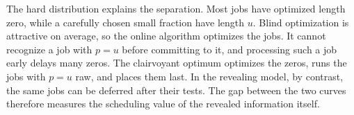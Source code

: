 The hard distribution explains the separation.  Most jobs have optimized
length zero, while a carefully chosen small fraction have length $u$.  Blind
optimization is attractive on average, so the online algorithm optimizes the
jobs.  It cannot recognize a job with $p=u$ before committing to it, and
processing such a job early delays many zeros.  The clairvoyant optimum
optimizes the zeros, runs the jobs with $p=u$ raw, and places them last.  In
the revealing model, by contrast, the same jobs can be deferred after their
tests.  The
gap between the two curves therefore measures the scheduling value of the
revealed information itself.
